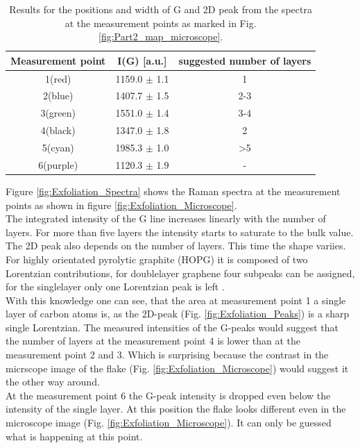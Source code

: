 \documentclass[12pt,a4paper]{article}
\begin{document}
\begin{table}[h]
\centering
\begin{tabular}{|c|c|c|}
\hline 
Measurement point & I(G) [a.u.] & suggested number of layers \\ 
\hline 
1(red) & 1159.0 $\pm$ 1.1 & 1 \\ 
\hline 
2(blue) & 1407.7 $\pm$ 1.5 & 2-3 \\ 
\hline 
3(green) & 1551.0 $\pm$ 1.4 & 3-4 \\ 
\hline 
4(black) & 1347.0 $\pm$ 1.8 & 2 \\ 
\hline 
5(cyan) & 1985.3 $\pm$ 1.0 & >5 \\
\hline 
6(purple) & 1120.3 $\pm$ 1.9 & -  \\ 
\hline 
\end{tabular} 
\caption{Results for the positions and width of G and 2D peak from the spectra at the measurement points as marked in Fig. \ref{fig:Part2_map_microscope}.}
\label{tab:step_G_intensities}
\end{table}

Figure \ref{fig:Exfoliation_Spectra} shows the Raman spectra at the measurement points as shown in figure \ref{fig:Exfoliation_Microscope}. \\
The integrated intensity of the G line increases linearly with the number of layers. For more than five layers the intensity starts to saturate to the bulk value. The 2D peak also depends on the number of layers. This time the shape variies. For highly orientated pyrolytic graphite (HOPG) it is composed of two Lorentzian contributions, for doublelayer graphene four subpeaks can be assigned, for the singlelayer only one Lorentzian peak is left \cite{Lett_2007}. \\
With this knowledge one can see, that the area at measurement point 1 a single layer of carbon atoms is, as the 2D-peak (Fig. \ref{fig:Exfoliation_Peaks}) is a sharp single Lorentzian. The measured intensities of the G-peaks would suggest that the number of layers at the measurement point 4 is lower than at the measurement point 2 and 3. Which is surprising because the contrast in the micrscope image of the flake (Fig. \ref{fig:Exfoliation_Microscope}) would suggest it the other way around. \\
At the measurement point 6 the G-peak intensity is dropped even below the intensity of the single layer. At this position the flake looks different even in the microscope image (Fig. \ref{fig:Exfoliation_Microscope}). It can only be guessed what is happening at this point.
\end{document}
